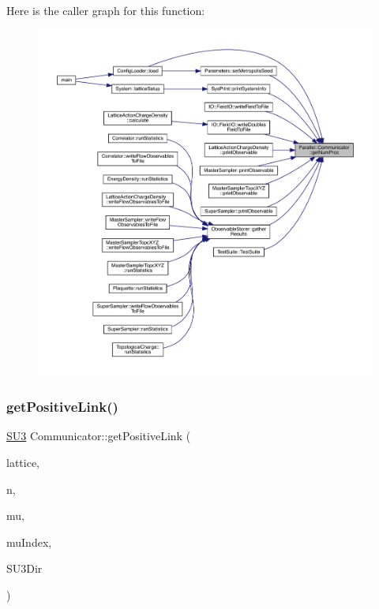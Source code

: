 Here is the caller graph for this function\+:
\nopagebreak
\begin{figure}[H]
\begin{center}
\leavevmode
\includegraphics[width=350pt]{class_parallel_1_1_communicator_a7b1f80fb49a0cc83f2031c3415174150_icgraph}
\end{center}
\end{figure}
\mbox{\label{class_parallel_1_1_communicator_a1c8d402df4a44becc1cab7a762f51432}} 
\subsubsection{\texorpdfstring{getPositiveLink()}{getPositiveLink()}}
{\footnotesize\ttfamily \mbox{\hyperlink{class_s_u3}{S\+U3}} Communicator\+::get\+Positive\+Link (\begin{DoxyParamCaption}\item[{\mbox{\hyperlink{class_lattice}{Lattice}}$<$ \mbox{\hyperlink{class_s_u3}{S\+U3}} $>$ $\ast$}]{lattice,  }\item[{std\+::vector$<$ int $>$}]{n,  }\item[{int}]{mu,  }\item[{int $\ast$}]{mu\+Index,  }\item[{int}]{S\+U3\+Dir }\end{DoxyParamCaption})\hspace{0.3cm}{\ttfamily [static]}}



